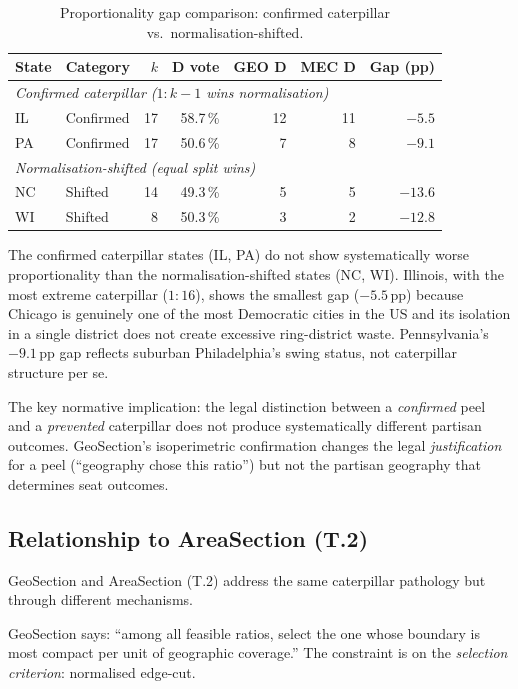 \begin{table}[h]
\centering
\caption{Proportionality gap comparison: confirmed caterpillar vs.\ normalisation-shifted.}
\label{tab:caterpillar-comparison}
\begin{tabular}{llrrrrr}
\toprule
State & Category & $k$ & D vote & GEO D & MEC D & Gap (pp) \\
\midrule
\multicolumn{7}{l}{\textit{Confirmed caterpillar ($1:k-1$ wins normalisation)}} \\
IL & Confirmed & 17 & 58.7\,\% & 12 & 11 & $-5.5$ \\
PA & Confirmed & 17 & 50.6\,\% & 7  & 8  & $-9.1$ \\
\midrule
\multicolumn{7}{l}{\textit{Normalisation-shifted (equal split wins)}} \\
NC & Shifted & 14 & 49.3\,\% & 5  & 5  & $-13.6$ \\
WI & Shifted & 8  & 50.3\,\% & 3  & 2  & $-12.8$ \\
\bottomrule
\end{tabular}
\end{table}

The confirmed caterpillar states (IL, PA) do not show systematically worse
proportionality than the normalisation-shifted states (NC, WI).
Illinois, with the most extreme caterpillar ($1:16$), shows the smallest
gap ($-5.5$\,pp) because Chicago is genuinely one of the most Democratic cities
in the US and its isolation in a single district does not create excessive
ring-district waste.
Pennsylvania's $-9.1$\,pp gap reflects suburban Philadelphia's swing status,
not caterpillar structure per se.

The key normative implication: the legal distinction between a
\emph{confirmed} peel and a \emph{prevented} caterpillar does not produce
systematically different partisan outcomes.
GeoSection's isoperimetric confirmation changes the legal \emph{justification}
for a peel (``geography chose this ratio'') but not the partisan geography
that determines seat outcomes.

\subsection{Relationship to AreaSection (T.2)}

GeoSection and AreaSection (T.2) address the same caterpillar pathology but
through different mechanisms.

GeoSection says: ``among all feasible ratios, select the one whose boundary
is most compact per unit of geographic coverage.''
The constraint is on the \emph{selection criterion}: normalised edge-cut.

